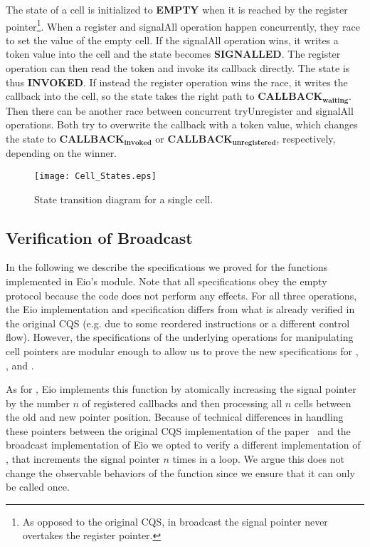 The state of a cell is initialized to \textbf{EMPTY} when it is reached by the register pointer\footnote{As opposed to the original CQS, in broadcast the signal pointer never overtakes the register pointer.}.
When a register and signalAll operation happen concurrently, they race to set the value of the empty cell.
If the signalAll operation wins, it writes a token value into the cell and the state becomes \textbf{SIGNALLED}.
The register operation can then read the token and invoke its callback directly.
The state is thus \textbf{INVOKED}.
If instead the register operation wins the race, it writes the callback into the cell, so the state takes the right path to \(\textbf{CALLBACK}_\textbf{waiting}\).
Then there can be another race between concurrent tryUnregister and signalAll operations.
Both try to overwrite the callback with a token value, which changes the state to \(\textbf{CALLBACK}_\textbf{invoked}\) or \(\textbf{CALLBACK}_\textbf{unregistered}\), respectively, depending on the winner.

\begin{figure}[ht]
  \texttt{[image: Cell\_States.eps]}
  \caption{State transition diagram for a single cell.}
  \label{fig:cqs-cell-states}
\end{figure}

\subsection{Verification of Broadcast}
\label{sec:broadcast-spec}

In the following we describe the specifications we proved for the functions implemented in Eio's  module.
Note that all specifications obey the empty protocol because the code does not perform any effects.
For all three operations, the Eio implementation and specification differs from what is already verified in the original CQS (e.g. due to some reordered instructions or a different control flow).
However, the specifications of the underlying operations for manipulating cell pointers are modular enough to allow us to prove the new specifications for , , and .

As for , Eio implements this function by atomically increasing the signal pointer by the number \(n\) of registered callbacks and then processing all \(n\) cells between the old and new pointer position.
Because of technical differences in handling these pointers between the original CQS implementation of the paper~\cite{koval2023cqs} and the broadcast implementation of Eio we opted to verify a different implementation of , that increments the signal pointer \(n\) times in a loop.
We argue this does not change the observable behaviors of the function since we ensure that it can only be called once.

